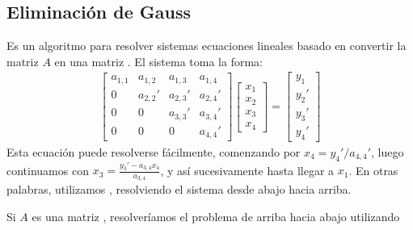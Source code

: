 \documentclass[letterpaper,10pt,english]{jupyterBook}
\begin{document}
\subsection{Eliminación de Gauss}
\label{\detokenize{1.2-Algebra_lineal/1.2-Algebra_lineal:eliminacion-de-gauss}}
\sphinxAtStartPar
Es un algoritmo para resolver sistemas ecuaciones lineales basado en convertir la matriz \(A\) en una matriz . El sistema toma la forma:
\begin{equation*}
\begin{split}\begin{bmatrix}
a_{1,1} & a_{1,2} & a_{1,3} & a_{1,4}\\
0 & a_{2,2}' & a_{2,3}' & a_{2,4}'\\
0 & 0 & a_{3,3}' & a_{3,4}' \\
0 & 0 & 0 & a_{4,4}'
\end{bmatrix}\left[\begin{array}{c} x_1 \\x_2 \\ x_3 \\x_4 \end{array}\right] =
\left[\begin{array}{c} y_1 \\y_2' \\ y_3' \\y_4' \end{array}\right]\end{split}
\end{equation*}
\sphinxAtStartPar
Esta ecuación puede resolverse fácilmente, comenzando por \(x_4 = y_4'/a_{4,4}'\), luego continuamos con \(x_3 = \frac{y_3' - a_{3,4}x_4}{ a_{3,4}}\), y así sucesivamente hasta llegar a \(x_1\). En otras palabras, utilizamos , resolviendo el sistema desde abajo hacia arriba.

\sphinxAtStartPar
Si \(A\) es una matriz , resolveríamos el problema de arriba hacia abajo utilizando 
\end{document}
